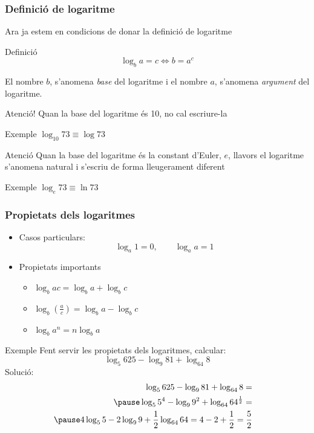 \documentclass{beamer}
\begin{document}
\begin{frame}\frametitle{Definició de logaritme}
Ara ja estem en condicions de donar la definició de logaritme
\begin{block}{Definició}
$$\log_{b}a=c\Leftrightarrow b=a^{c}$$
\end{block}
\pause El nombre $b$, s'anomena \emph{base} del logaritme i el
nombre $a$, s'anomena \emph{argument} del logaritme.

\end{frame}
\begin{frame}
\begin{alertblock}{Atenció!}
Quan la base del logaritme és 10, no cal escriure-la
\end{alertblock}\pause
\begin{exampleblock}{Exemple}
$\log_{10}73\equiv\log73$
\end{exampleblock}\pause
\begin{alertblock}{Atenció}
Quan la base del logaritme és la constant d'Euler, $e$, llavors el
logaritme s'anomena natural i s'escriu de forma lleugerament
diferent
\end{alertblock}\pause
\begin{exampleblock}{Exemple}
$\log_{e}73\equiv\ln73$
\end{exampleblock}
\end{frame}
\begin{frame}\frametitle{Propietats dels logaritmes}
\begin{itemize}
\item
Casos particulars:\\
$$\log_{a}1=0,\qquad \log_{a}a=1$$\pause
\item
Propietats importants
\begin{itemize}
\item
$\log_{b}ac=\log_{b}a+\log_{b}c$\pause
\item
$\log_{b}\left(\frac{a}{c}\right)=\log_{b}a-\log_{b}c$\pause
\item
$\log_{b}a^{n}=n\log_{b}a$
\end{itemize}
\end{itemize}
\end{frame}
\begin{frame}
\begin{exampleblock}{Exemple}
Fent servir les propietats dels logaritmes, calcular:
$$\log_{5}625-\log_{9}81+\log_{64}8$$\pause
Solució:
\begin{align*}
\log_{5}625-\log_{9}81+\log_{64}8=&&\\\pause
\log_{5}5^{4}-\log_{9}9^{2}+\log_{64}64^{\frac{1}{2}}=&\\\pause
4\log_{5}5-2\log_{9}9+\frac{1}{2}\log_{64}64= 4-2+\frac{1}{2}=\frac{5}{2}\\
\end{align*}
\end{exampleblock}
\end{frame}
\end{document}
